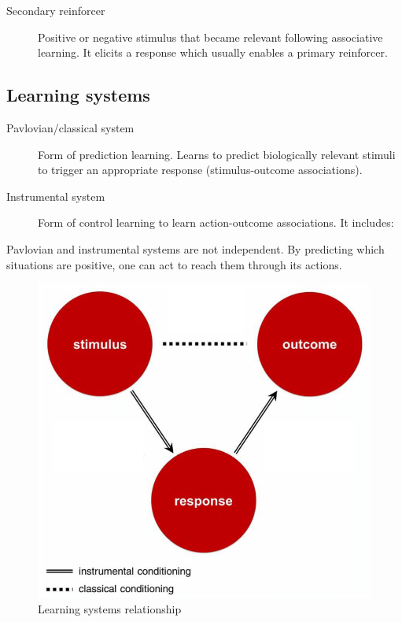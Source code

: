 \begin{description}
\begin{descriptionlist}
\begin{description}
                    \item[Secondary reinforcer] 
                        Positive or negative stimulus that became relevant following associative learning.
                        It elicits a response which usually enables a primary reinforcer.
                \end{description}
        \end{descriptionlist}
\end{description}


\subsection{Learning systems}

\begin{description}
    \item[Pavlovian/classical system] 
        Form of prediction learning.
        Learns to predict biologically relevant stimuli to trigger an appropriate response (stimulus-outcome associations).

    \item[Instrumental system] 
        Form of control learning to learn action-outcome associations.
        It includes:
\end{description}

\begin{remark}
    Pavlovian and instrumental systems are not independent.
    By predicting which situations are positive, one can act to reach them through its actions.

    \begin{figure}[H]
        \centering
        \includegraphics[width=0.35\linewidth]{./img/learning_systems.png}
        \caption{Learning systems relationship}
    \end{figure}
\end{remark}




